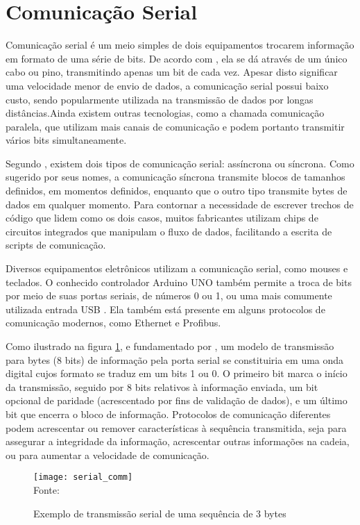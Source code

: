 \section{Comunicação Serial}

Comunicação serial é um meio simples de dois equipamentos trocarem informação em formato de uma série de bits. De acordo com , ela se dá através de um único cabo ou pino, transmitindo apenas um bit de cada vez. Apesar disto significar uma velocidade menor de envio de dados, a comunicação serial possui baixo custo, sendo popularmente utilizada na transmissão de dados por longas distâncias.Ainda existem outras tecnologias, como a chamada comunicação paralela, que utilizam mais canais de comunicação e podem portanto transmitir vários bits simultaneamente.

Segundo , existem dois tipos de comunicação serial: assíncrona ou síncrona. Como sugerido por seus nomes, a comunicação síncrona transmite blocos de tamanhos definidos, em momentos definidos, enquanto que o outro tipo transmite bytes de dados em qualquer momento. Para contornar a necessidade de escrever trechos de código que lidem como os dois casos, muitos fabricantes utilizam chips de circuitos integrados que manipulam o fluxo de dados, facilitando a escrita de scripts de comunicação.

Diversos equipamentos eletrônicos utilizam a comunicação serial, como mouses e teclados. O conhecido controlador Arduino UNO também permite a troca de bits por meio de suas portas seriais, de números 0 ou 1, ou uma mais comumente utilizada entrada USB \cite{ArduinoSerial}. Ela também está presente em alguns protocolos de comunicação modernos, como Ethernet e Profibus.

Como ilustrado na figura \ref{img_serial_comm}, e fundamentado por , um modelo de transmissão para bytes (8 bits) de informação pela porta serial se constituiria em uma onda digital cujos formato se traduz em um bits 1 ou 0. O primeiro bit marca o início da transmissão, seguido por 8 bits relativos à informação enviada, um bit opcional de paridade (acrescentado por fins de validação de dados), e um último bit que encerra o bloco de informação. Protocolos de comunicação diferentes podem acrescentar ou remover características à sequência transmitida, seja para assegurar a integridade da informação, acrescentar outras informações na cadeia, ou para aumentar a velocidade de comunicação.

\begin{figure}[hbt]
	\centering
	\caption{Exemplo de transmissão serial de uma sequência de 3 bytes}
	\texttt{[image: serial\_comm]} \\
	Fonte: 
	\label{img_serial_comm}
\end{figure}

